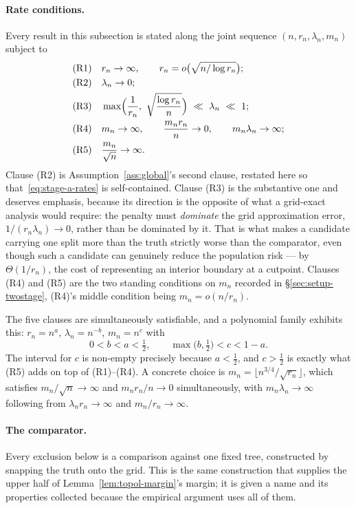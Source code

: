 \documentclass[11pt]{article}
\theoremstyle{plain}
\theoremstyle{definition}
\theoremstyle{remark}
\begin{document}
\paragraph{Rate conditions.}
Every result in this subsection is stated along the joint sequence
\((n,r_n,\lambda_n,m_n)\) subject to
\begin{equation}\label{eq:stage-a-rates}
\begin{aligned}
  &\text{(R1)}&&r_n\to\infty,
    \qquad r_n=o\bigl(\sqrt{n/\log r_n}\bigr);\\
  &\text{(R2)}&&\lambda_n\to0;\\
  &\text{(R3)}&&\max\Bigl(\frac1{r_n},\ \sqrt{\frac{\log r_n}{n}}\Bigr)
    \ \ll\ \lambda_n\ \ll\ 1;\\
  &\text{(R4)}&&m_n\to\infty,
    \qquad \frac{m_nr_n}{n}\to0,
    \qquad m_n\lambda_n\to\infty;\\
  &\text{(R5)}&&\frac{m_n}{\sqrt n}\to\infty.
\end{aligned}
\end{equation}
Clause (R2) is Assumption~\ref{ass:global}'s second clause, restated here so
that~\eqref{eq:stage-a-rates} is self-contained. Clause (R3) is the substantive
one and deserves emphasis, because its direction is the opposite of what a
grid-exact analysis would require: the penalty must \emph{dominate} the grid
approximation error, \(1/(r_n\lambda_n)\to0\), rather than be dominated by it.
That is what makes a candidate carrying one split more than the truth strictly
worse than the comparator, even though such a candidate can genuinely reduce
the population risk --- by \(\Theta(1/r_n)\), the cost of representing an
interior boundary at a cutpoint. Clauses (R4) and (R5) are the two standing
conditions on \(m_n\) recorded in \S\ref{sec:setup-twostage}, (R4)'s middle
condition being \(m_n=o(n/r_n)\).

The five clauses are simultaneously satisfiable, and a polynomial family
exhibits this: \(r_n=n^a\), \(\lambda_n=n^{-b}\), \(m_n=n^c\) with
\[
  0<b<a<\tfrac12,
  \qquad
  \max\bigl(b,\tfrac12\bigr)<c<1-a .
\]
The interval for \(c\) is non-empty precisely because \(a<\tfrac12\), and
\(c>\tfrac12\) is exactly what (R5) adds on top of (R1)--(R4). A concrete
choice is \(m_n=\lfloor n^{3/4}/\sqrt{r_n}\rfloor\), which satisfies
\(m_n/\sqrt n\to\infty\) and \(m_nr_n/n\to0\) simultaneously, with
\(m_n\lambda_n\to\infty\) following from \(\lambda_nr_n\to\infty\) and
\(m_n/r_n\to\infty\).

\paragraph{The comparator.}
Every exclusion below is a comparison against one fixed tree, constructed by
snapping the truth onto the grid. This is the same construction that supplies
the upper half of Lemma~\ref{lem:topol-margin}'s margin; it is given a name
and its properties collected because the empirical argument uses all of them.
\end{document}
